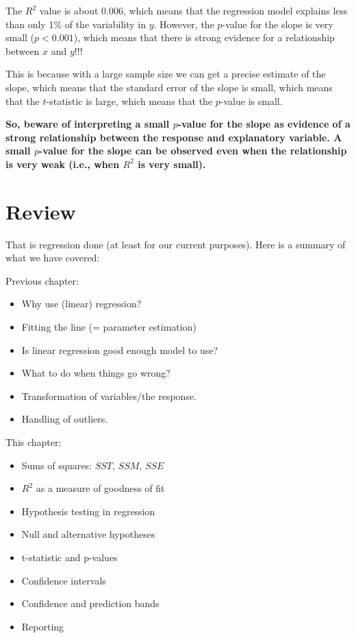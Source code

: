 \documentclass[
  letterpaper,
  8pt,
  a4paper]{book}
\providecommand{\tightlist}{%
  \setlength{\itemsep}{0pt}\setlength{\parskip}{0pt}}
\begin{document}
The \(R^2\) value is about 0.006, which means that the regression model
explains less than only 1\% of the variability in \(y\). However, the
\(p\)-value for the slope is very small (\(p < 0.001\)), which means
that there is strong evidence for a relationship between \(x\) and
\(y\)!!!

This is because with a large sample size we can get a precise estimate
of the slope, which means that the standard error of the slope is small,
which means that the \(t\)-statistic is large, which means that the
\(p\)-value is small.

\textbf{So, beware of interpreting a small \(p\)-value for the slope as
evidence of a strong relationship between the response and explanatory
variable. A small \(p\)-value for the slope can be observed even when
the relationship is very weak (i.e., when \(R^2\) is very small).}

\section*{Review}\label{review-2}


That is regression done (at least for our current purposes). Here is a
summary of what we have covered:

Previous chapter:

\begin{itemize}
\tightlist
\item
  Why use (linear) regression?
\item
  Fitting the line (= parameter estimation)
\item
  Is linear regression good enough model to use?
\item
  What to do when things go wrong?
\item
  Transformation of variables/the response.
\item
  Handling of outliers.
\end{itemize}

This chapter:

\begin{itemize}
\tightlist
\item
  Sums of squares: \(SST\), \(SSM\), \(SSE\)
\item
  \(R^2\) as a measure of goodness of fit
\item
  Hypothesis testing in regression
\item
  Null and alternative hypotheses
\item
  t-statistic and p-values
\item
  Confidence intervals
\item
  Confidence and prediction bands
\item
  Reporting
\end{itemize}
\end{document}
